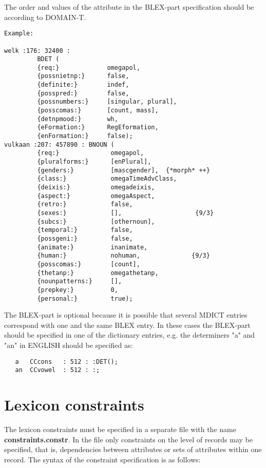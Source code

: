 The order and values of the attribute in the BLEX-part specification should be 
according to DOMAIN-T. 
\begin{verbatim}
Example:

welk :176: 32400 :
         BDET (
         {req:}             omegapol,
         {possnietnp:}      false,
         {definite:}        indef,
         {posspred:}        false,
         {possnumbers:}     [singular, plural],
         {posscomas:}       [count, mass],
         {detnpmood:}       wh,
         {eFormation:}      RegEformation,
         {enFormation:}     false);
vulkaan :207: 457890 : BNOUN (
         {req:}              omegapol,
         {pluralforms:}      [enPlural],
         {genders:}          [mascgender],  {*morph* ++} 
         {class:}            omegaTimeAdvClass,
         {deixis:}           omegadeixis,
         {aspect:}           omegaAspect,
         {retro:}            false,
         {sexes:}            [],                    {9/3}
         {subcs:}            [othernoun],
         {temporal:}         false,
         {possgeni:}         false,
         {animate:}          inanimate,
         {human:}            nohuman,              {9/3}
         {posscomas:}        [count],
         {thetanp:}          omegathetanp,
         {nounpatterns:}     [],
         {prepkey:}          0,
         {personal:}         true);
\end{verbatim}

The BLEX-part is optional because it is possible that
several MDICT entries correspond with one and the same BLEX entry. In these 
cases the BLEX-part should be specified in one of the dictionary entries, e.g.
the determiners "a" and "an" in ENGLISH should be specified as:

\begin{verbatim}
   a   CCcons   : 512 : :DET();
   an  CCvowel  : 512 : :;

\end{verbatim}

\section{Lexicon constraints}

The lexicon constraints must be specified in a separate file with the
name {\bf constraints.constr}. In the file only constraints on the level of 
records may be specified, that is, dependencies between attributes or
sets of attributes within one record. The syntax of the constraint 
specification is as follows:

